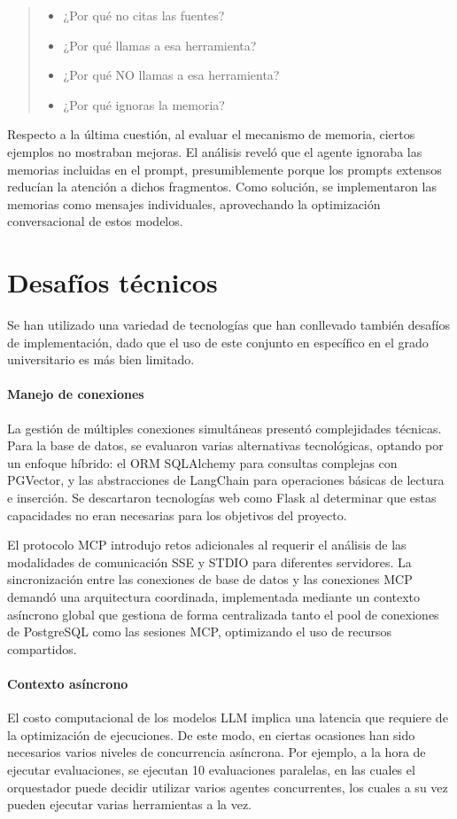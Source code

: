 \begin{quote}
\begin{itemize}
    \item ¿Por qué no citas las fuentes? 
    \item ¿Por qué llamas a esa herramienta?
    \item ¿Por qué NO llamas a esa herramienta?
    \item ¿Por qué ignoras la memoria?
\end{itemize}
\end{quote}

Respecto a la última cuestión, al evaluar el mecanismo de memoria, ciertos ejemplos no mostraban mejoras. El análisis reveló que el agente ignoraba las memorias incluidas en el prompt, presumiblemente porque los prompts extensos reducían la atención a dichos fragmentos. Como solución, se implementaron las memorias como mensajes individuales, aprovechando la optimización conversacional de estos modelos.

\section{Desafíos técnicos}
Se han utilizado una variedad de tecnologías que han conllevado también desafíos de implementación, dado que el uso de este conjunto en específico en el grado universitario es más bien limitado.

\paragraph{Manejo de conexiones}
La gestión de múltiples conexiones simultáneas presentó complejidades técnicas. Para la base de datos, se evaluaron varias alternativas tecnológicas, optando por un enfoque híbrido: el ORM SQLAlchemy para consultas complejas con PGVector, y las abstracciones de LangChain para operaciones básicas de lectura e inserción. Se descartaron tecnologías web como Flask al determinar que estas capacidades no eran necesarias para los objetivos del proyecto.

El protocolo MCP introdujo retos adicionales al requerir el análisis de las modalidades de comunicación SSE y STDIO para diferentes servidores. La sincronización entre las conexiones de base de datos y las conexiones MCP demandó una arquitectura coordinada, implementada mediante un contexto asíncrono global que gestiona de forma centralizada tanto el pool de conexiones de PostgreSQL como las sesiones MCP, optimizando el uso de recursos compartidos.

\paragraph{Contexto asíncrono}
El costo computacional de los modelos LLM implica una latencia que requiere de la optimización de ejecuciones. De este modo, en ciertas ocasiones han sido necesarios varios niveles de concurrencia asíncrona. Por ejemplo, a la hora de ejecutar evaluaciones, se ejecutan 10 evaluaciones paralelas, en las cuales el orquestador puede decidir utilizar varios agentes concurrentes, los cuales a su vez pueden ejecutar varias herramientas a la vez. 

